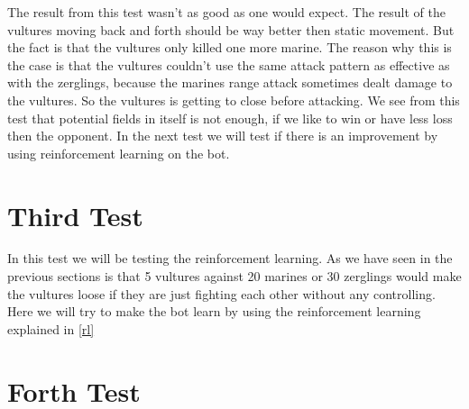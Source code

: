 The result from this test wasn't as good as one would expect. The result of the vultures moving back and forth should be way better then static movement. But the fact is that the vultures only killed one more marine. The reason why this is the case is that the vultures couldn't use the same attack pattern as effective as with the zerglings, because the marines range attack sometimes dealt damage to the vultures. So the vultures is getting to close before attacking.
We see from this test that potential fields in itself is not enough, if we like to win or have less loss then the opponent. In the next test we will test if there is an improvement by using reinforcement learning on the bot.

\section{Third Test}
In this test we will be testing the reinforcement learning. As we have seen in the previous sections is that 5 vultures against 20 marines or 30 zerglings would make the vultures loose if they are just fighting each other without any controlling. Here we will try to make the bot learn by using the reinforcement learning explained in \ref{rl} 

\section{Forth Test}



